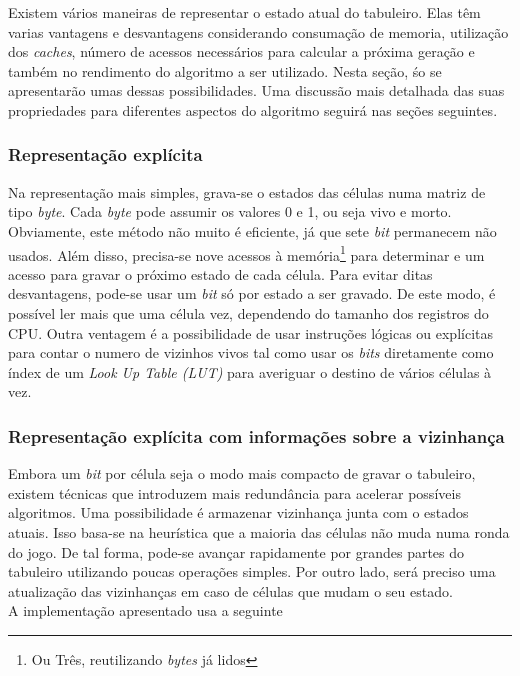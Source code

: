 Existem vários maneiras de representar o estado atual do tabuleiro. Elas têm varias vantagens e desvantagens considerando consumação de memoria, utilização dos \textit{caches}, número de acessos necessários para calcular a próxima geração e também no rendimento do algoritmo a ser utilizado. Nesta seção, śo se apresentarão umas dessas possibilidades. Uma discussão mais detalhada das suas propriedades para diferentes aspectos do algoritmo seguirá nas seções seguintes.\\

\subsubsection{Representação explícita}
Na representação mais simples, grava-se o estados das células numa matriz de tipo \textit{byte}. Cada \textit{byte} pode assumir os valores 0 e 1, ou seja vivo e morto. Obviamente, este método não muito é eficiente, já que sete \textit{bit} permanecem não usados. Além disso, precisa-se nove acessos à memória\footnote{Ou Três, reutilizando \textit{bytes} já lidos} para determinar e um acesso para gravar o próximo estado de cada célula. Para evitar ditas desvantagens, pode-se usar um \textit{bit} só por estado a ser gravado. De este modo, é possível ler mais que uma célula vez, dependendo do tamanho dos registros do CPU. Outra ventagem é a possibilidade de usar instruções lógicas ou explícitas para contar o numero de vizinhos vivos tal como usar os \textit{bits} diretamente como índex de um \textit{Look Up Table (LUT)} para averiguar o destino de vários células à vez.\\

\subsubsection{Representação explícita com informações sobre a vizinhança}
Embora um \textit{bit} por célula seja o modo mais compacto de gravar o tabuleiro, existem técnicas que introduzem mais redundância para acelerar possíveis algoritmos. Uma possibilidade é armazenar vizinhança junta com o estados atuais. Isso basa-se na heurística que a maioria das células não muda numa ronda do jogo. De tal forma, pode-se avançar rapidamente por grandes partes do tabuleiro utilizando poucas operações simples. Por outro lado, será preciso uma atualização das vizinhanças em caso de células que mudam o seu estado.\\

A implementação apresentado usa a seguinte

